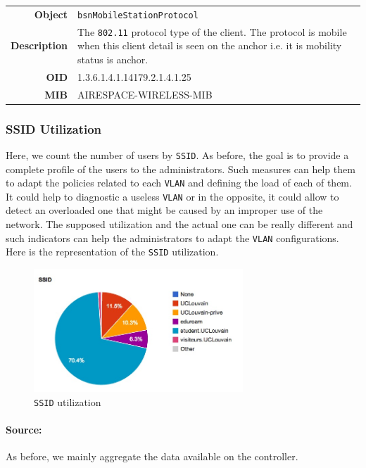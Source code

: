 \noindent
\begin{tabular}{|r l|}
\hline 
\textbf{Object} & \texttt{bsnMobileStationProtocol} \\
\textbf{Description} & \parbox{11cm}{The \texttt{802.11} protocol type of the client. The protocol is mobile when this client detail is seen on the anchor i.e. it is mobility status is anchor.} \\
\textbf{OID} & 1.3.6.1.4.1.14179.2.1.4.1.25 \\
\textbf{MIB} & AIRESPACE-WIRELESS-MIB \\
\hline
\end{tabular}

\subsubsection*{SSID Utilization}
Here, we count the number of users by \texttt{SSID}. As before, the goal is to provide a complete profile of the users to the administrators. Such measures can help them to adapt the policies related to each \texttt{VLAN} and defining the load of each of them. It could help to diagnostic a useless \texttt{VLAN} or in the opposite, it could allow to detect an overloaded one that might be caused by an improper use of the network. The supposed utilization and the actual one can be really different and such indicators can help the administrators to adapt the \texttt{VLAN} configurations. Here is the representation of the \texttt{SSID} utilization.
\begin{figure}[H]
	\centering
   \includegraphics[width=0.7\textwidth]{Pictures/chapter5/ssid-utilization.jpg}
   \caption{\texttt{SSID} utilization}
\end{figure} 

\paragraph*{Source:} As before, we mainly aggregate the data available on the controller.

